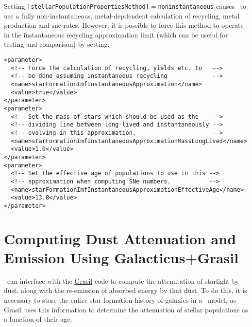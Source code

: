 Setting {\tt [stellarPopulationPropertiesMethod]}$=${\tt noninstantaneous} causes \glc\ to use a fully non-instantaneous, metal-depdendent calculation of recycling, metal production and \gls{sne} rates. However, it is possible to force this method to operate in the instantaneous recycling approximation limit (which can be useful for testing and comparison) by setting:
\begin{verbatim}
<parameter>
  <!-- Force the calculation of recycling, yields etc. to   -->
  <!-- be done assuming instantaneous recycling             -->
  <name>starFormationImfInstantaneousApproximation</name>
  <value>true</value>
</parameter>
<parameter>
  <!-- Set the mass of stars which should be used as the    -->
  <!-- dividing line between long-lived and instantaneously -->
  <!-- evolving in this approximation.                      -->
  <name>starFormationImfInstantaneousApproximationMassLongLived</name>
  <value>1.0</value>
</parameter>
<parameter>
  <!-- Set the effective age of populations to use in this -->
  <!-- approximation when computing SNe numbers.           -->
  <name>starFormationImfInstantaneousApproximationEffectiveAge</name>
  <value>13.8</value>
</parameter>
\end{verbatim}

\section{Computing Dust Attenuation and Emission Using Galacticus+Grasil}\label{sec:TutorialGrasil}

\glc\ can interface with the \href{http://adlibitum.oat.ts.astro.it/silva/grasil/grasil.html}{\sc Grasil} code to compute the attenutation of starlight by dust, along with the re-emission of absorbed energy by that dust. To do this, it is necessary to store the entire star formation history of galaxies in a \glc\ model, as {\sc Grasil} uses this information to determine the attenuation of stellar populations as a function of their age.

